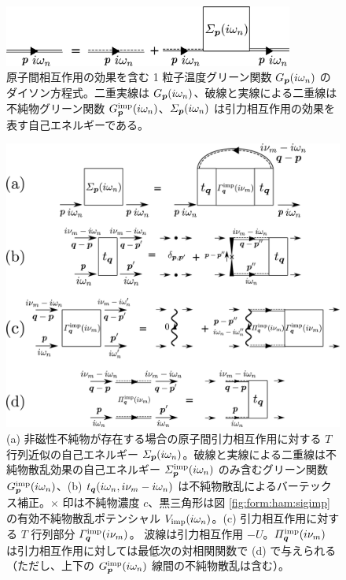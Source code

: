 
\begin{figure}[t]
\begin{center}
\includegraphics[height=20mm]{eps/dyson-tma-imp.eps}
\end{center}
\caption{原子間相互作用の効果を含む 1 粒子温度グリーン関数 $G_{\bm{p}}(i\omega_n)$ のダイソン方程式。二重実線は $G_{\bm{p}}(i\omega_n)$、破線と実線による二重線は不純物グリーン関数 $G^{\text{imp}}_{\bm{p}}(i\omega_n)$、$\varSigma_{\bm{p}}(i\omega_n)$ は引力相互作用の効果を表す自己エネルギーである。}
\label{fig:form:tma:greenall}
\end{figure}


\begin{figure}[t]
\centering
\includegraphics[width=123mm]{eps/sig-gamimpt.eps}
\caption{(a) 非磁性不純物が存在する場合の原子間引力相互作用に対する $T$ 行列近似の自己エネルギー $\varSigma_{\bm{p}}(i\omega_n)$。破線と実線による二重線は不純物散乱効果の自己エネルギー $\varSigma^{\text{imp}}_{\bm{p}}(i\omega_n)$ のみ含むグリーン関数 $G^{\text{imp}}_{\bm{p}}(i\omega_n)$、(b) $t_{\bm{q}}(i\omega_n,i\nu_m-i\omega_n)$ は不純物散乱によるバーテックス補正。$\times$ 印は不純物濃度 $c$、黒三角形は図 \ref{fig:form:ham:sigimp} の有効不純物散乱ポテンシャル $V_{\text{imp}} (i\omega_n)$。(c) 引力相互作用に対する $T$ 行列部分 $\varGamma^{\text{imp}}_{\bm{q}}(i\nu_m)$。 波線は引力相互作用 $-U$。$\varPi^{\text{imp}}_{\bm{q}}(i\nu_m)$ は引力相互作用に対しては最低次の対相関関数で (d) で与えられる（ただし、上下の $G^{\text{imp}}_{\bm{p}}(i\omega_n)$ 線間の不純物散乱は含む）。}
\label{fig:form:tma:sigall}
\label{fig:form:tma:sigvtx}
\label{fig:form:tma:gamimp}
\label{fig:form:tma:piimp}
\end{figure}


